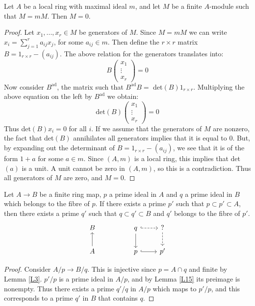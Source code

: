 \documentclass{../mathnotes}
\begin{document}
\begin{lem} 
\label{L16}
Let $A$ be a local ring with maximal ideal $m$, and let $M$ be a finite $A$-module such that $M = mM$. Then $M=0$.
\end{lem}
\begin{proof}
Let $x_1, ... , x_r \in M$ be generators of $M$. Since $M = mM$ we can write $x_i = \sum_{j=1}^r a_{ij} x_j$, for some $a_{ij} \in m$. Then define the $r\times r$ matrix $B = 1_{r\times r} - (a_{ij})$. The above relation for the generators translates into:
\[     B \left(  \begin{array} {c} x_1 \\ \vdots \\ x_r  \end{array}  \right)  = 0   \]
Now consider $B^{\text{ad}}$, the matrix such that $B^{\text{ad}} B =$ det$(B) 1_{r\times r}$. Multiplying the above equation on the left by $B^{\text{ad}}$ we obtain:
\[    \text{det}(B) \left(  \begin{array} {c} x_1 \\ \vdots \\ x_r  \end{array}  \right)  = 0   \]
Thus det$(B) x_i = 0$ for all $i$. If we assume that the generators of $M$ are nonzero, the fact that det$(B)$ annihilates all generators implies that it is equal to 0. But, by expanding out the determinant of $B = 1_{r\times r} - (a_{ij})$, we see that it is of the form $1+a$ for some $a\in m$. Since $(A,m)$ is a local ring, this implies that det$(a)$ is a unit. A unit cannot be zero in $(A, m)$, so this is a contradiction. Thus all generators of $M$ are zero, and $M=0$.
\end{proof}

\begin{lem} 
\label{L17}
Let $A \to B$ be a finite ring map, $p$ a prime ideal in $A$ and $q$ a prime ideal in $B$ which belongs to the fibre of $p$. If there exists a prime $p'$ such that $p \subset p' \subset A$, then there exists a prime $q'$ such that $q\subset q' \subset B$ and $q'$ belongs to the fibre of $p'$.
\[
\begin{tikzcd}
B & & q\arrow{d}\arrow[dashed, hook]{r} & ?\arrow[dashed]{d} \\
A\arrow{u} &   & p\arrow[hook]{r} & p'
\end{tikzcd}
\]
\end{lem}
\begin{proof}
Consider $A/p \to B/q$. This is injective since $p = A \cap q$ and finite by Lemma \ref{L3}. $p'/p$ is a prime ideal in $A/p$, and by Lemma \ref{L15} its preimage is nonempty. Thus there exists a prime $q'/q$ in $A/p$ which maps to $p'/p$, and this corresponds to a prime $q'$ in $B$ that contains $q$.
\end{proof}
\end{document}
